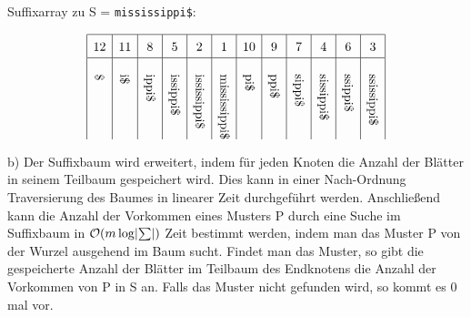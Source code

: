 \documentclass[a4paper]{scrartcl}
\DeclarePairedDelimiter\abs{\lvert}{\rvert}
\def\Oh{\ensuremath{\mathcal{O}}} %
\begin{document}
\begin{center}
\begin{figure}[H]
{
        }
    \end{figure}
\end{center}
Suffixarray zu S = \texttt{mississippi\$}:

\begin{equation}
    \def\arraystretch{1.5}
    \begin{array}{|c|c|c|c|c|c|c|c|c|c|c|c|}
        \hline
        12 & 11 & 8 & 5 & 2 & 1 & 10 & 9 & 7 & 4 & 6 & 3 \\
        \hline
        \rotatebox{-90}{\$} & \rotatebox{-90}{i\$} & \rotatebox{-90}{ippi\$} &
         \rotatebox{-90}{issippi\$} & \rotatebox{-90}{ississippi\$} & \rotatebox{-90}{mississippi\$}  & 
         \rotatebox{-90}{pi\$} & \rotatebox{-90}{ppi\$} & \rotatebox{-90}{sippi\$} & 
         \rotatebox{-90}{sissippi\$} & \rotatebox{-90}{ssippi\$} & \rotatebox{-90}{ssissippi\$} \\
    \end{array}
\end{equation}

b) Der Suffixbaum wird erweitert, indem für jeden Knoten die Anzahl der Blätter in seinem Teilbaum gespeichert wird. Dies kann in einer Nach-Ordnung Traversierung des Baumes in linearer Zeit durchgeführt werden.
 Anschließend kann die Anzahl der Vorkommen eines Musters P durch eine Suche im Suffixbaum in $\Oh(m\log\abs\sum)$ Zeit bestimmt werden, indem
man das Muster P von der Wurzel ausgehend im Baum sucht. Findet man das Muster, so gibt die gespeicherte Anzahl der Blätter im Teilbaum des 
Endknotens die Anzahl der Vorkommen von P in S an. Falls das Muster nicht gefunden wird, so kommt es 0 mal vor.
\end{document}
